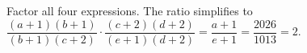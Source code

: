 Factor all four expressions. The ratio simplifies to $\dfrac{(a+1)(b+1)}{(b+1)(c+2)}\cdot\dfrac{(c+2)(d+2)}{(e+1)(d+2)}=\dfrac{a+1}{e+1}=\dfrac{2026}{1013}=\boxed2$.
